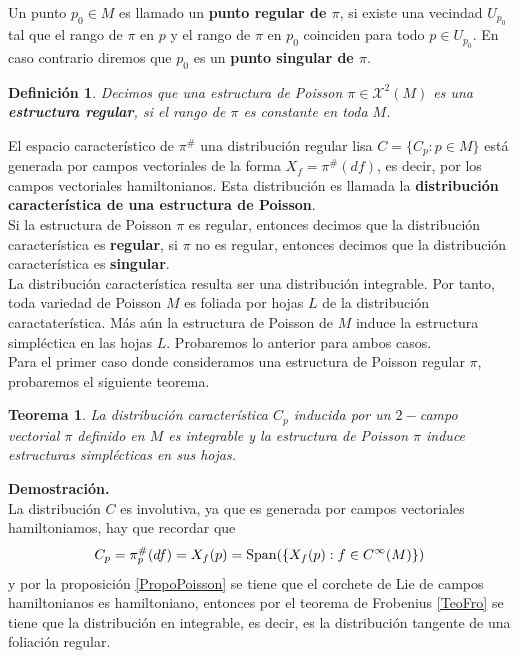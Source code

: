 \documentclass[a4paper,10pt]{book}
\newtheorem{teo}{Teorema}[chapter]
\newtheorem{definicion}{Definici\'on}[chapter]
\begin{document}
Un punto $p_{0}\in M$ es llamado un {\bfseries punto regular de $\pi$}, si existe una vecindad $U_{p_{0}}$ tal que el rango de $\pi$ en $p$ y el rango de $\pi$ en $p_{0}$ coinciden para todo $p\in U_{p_{0}}$. En caso contrario diremos que $p_{0}$ es un {\bfseries punto singular de $\pi$}.

\begin{definicion}
Decimos que una estructura de Poisson $\pi\in\mathcal{X}^{2}(M)$ es una {\bfseries estructura regular}, si el rango de $\pi$ es constante en toda $M$.  
\end{definicion}

El espacio caracter\'istico de $\pi^{\#}$ una distribuci\'on regular lisa $C=\{C_{p}:p\in M\}$ est\'a generada por campos vectoriales de la forma $X_{f}=\pi^{\#}(df)$, es decir, por los campos vectoriales hamiltonianos. Esta distribuci\'on es llamada la {\bfseries distribuci\'on caracter\'istica de una estructura de Poisson}.\\

Si la estructura de Poisson $\pi$ es regular, entonces decimos que la distribuci\'on caracter\'istica es {\bfseries regular}, si $\pi$ no es regular, entonces decimos que la distribuci\'on caracter\'istica es {\bfseries singular}.\\

La distribuci\'on caracter\'istica resulta ser una distribuci\'on integrable. Por tanto, toda variedad de Poisson $M$ es foliada por hojas $L$ de la distribuci\'on caractater\'istica. M\'as a\'un la estructura de Poisson de $M$ induce la estructura simpl\'ectica en las hojas $L$. Probaremos lo anterior para ambos casos.\\

Para el primer caso donde consideramos una estructura de Poisson regular $\pi$, probaremos el siguiente teorema.
\begin{teo}
La distribuci\'on caracter\'istica $C_{p}$ inducida por un $2-$campo vectorial $\pi$ definido en $M$ es integrable y la estructura de Poisson $\pi$ induce estructuras simpl\'ecticas en sus hojas.  
\end{teo}
{\bfseries Demostraci\'on.}\\
La distribuci\'on $C$ es involutiva, ya que es generada por campos vectoriales hamiltoniamos, hay que recordar que 
$$C_{p}=\pi^{\#}_{p}(df)=X_{f}(p)={\rm Span}(\{X_{f}(p):f\in C^{\infty}(M)\})$$ 
y por la proposici\'on \ref{PropoPoisson} se tiene que el corchete de Lie de campos hamiltonianos es hamiltoniano, entonces por el teorema de Frobenius \ref{TeoFro} se tiene que la distribuci\'on en integrable, es decir, es la distribuci\'on tangente de una foliaci\'on regular.\\
\end{document}
